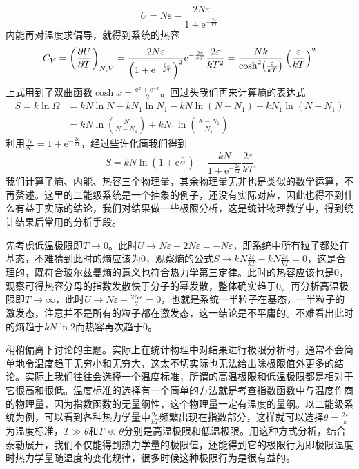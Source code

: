 \documentclass[../../main.tex]{subfiles}
\begin{document}
\begin{equation}
    U=N\varepsilon-\frac{2N\varepsilon}{1+\mathrm{e}^{-\frac{2\varepsilon}{kT}}}
\end{equation}
内能再对温度求偏导，就得到系统的热容
\begin{equation}
    C_V=\left(\pdv{U}{T}\right)_{N,V}=\frac{2N\varepsilon}{\left(1+\mathrm{e}^{-\frac{2\varepsilon}{kT}}\right)^2}\mathrm{e}^{-\frac{2\varepsilon}{kT}}\frac{2\varepsilon}{kT^2}=\frac{Nk}{\cosh[2](\frac{\varepsilon}{kT})}\left(\frac{\varepsilon}{kT}\right)^2
\end{equation}
上式用到了双曲函数\(\cosh x =\frac{\mathrm{e}^x+\mathrm{e}^{-x}}{2}\)。回过头我们再来计算熵的表达式
\begin{equation*}
    \begin{split}
        S=k\ln \Omega &=kN\ln N-kN_1\ln N_1-kN\ln(N-N_1) +kN_1\ln(N-N_1)\\
        &= kN\ln(\frac{N}{N-N_1})+kN_1\ln(\frac{N-N_1}{N_1})
    \end{split}
\end{equation*}
利用\(\frac{N}{N_1}=1+\mathrm{e}^{-\frac{2\varepsilon}{kT}}\)，经过些许化简我们得到
\begin{equation}
    S=kN\ln(1+\mathrm{e}^{\frac{2\varepsilon}{kT}})-\frac{kN}{1+\mathrm{e}^{-\frac{2\varepsilon}{kT}}}\frac{2\varepsilon}{kT}
\end{equation}
我们计算了熵、内能、热容三个物理量，其余物理量无非也是类似的数学运算，不再赘述。这里的二能级系统是一个抽象的例子，还没有实际对应，因此也得不到什么有益于实际的结论，我们对结果做一些极限分析，这是统计物理教学中，得到统计结果后常用的分析手段。

先考虑低温极限即\(T\to0\)。此时\(U\to N\varepsilon-2N\varepsilon=-N\varepsilon\)，即系统中所有粒子都处在基态，不难猜到此时的熵应该为0，观察熵的公式\(S\to kN\frac{2\varepsilon}{kT}-kN\frac{2\varepsilon}{kT}=0\)，这是合理的，既符合玻尔兹曼熵的意义也符合热力学第三定律。此时的热容应该也是0，观察可得热容分母的指数发散快于分子的幂发散，整体确实趋于0。再分析高温极限即\(T\to \infty\)，此时\(U\to N\varepsilon-\frac{2N\varepsilon}{2}=0\)，也就是系统一半粒子在基态，一半粒子的激发态，注意并不是所有的粒子都在激发态，这一结论是不平庸的。不难看出此时的熵趋于\(kN\ln2\)而热容再次趋于0。

稍稍偏离下讨论的主题。实际上在统计物理中对结果进行极限分析时，通常不会简单地令温度趋于无穷小和无穷大，这太不切实际也无法给出除极限值外更多的结论。实际上我们往往会选择一个温度标准，所谓的高温极限和低温极限都是相对于它很高和很低。温度标准的选择有一个简单的方法就是考查指数函数中与温度作商的物理量，因为指数函数的无量纲性，这个物理量一定有温度的量纲。以二能级系统为例，可以看到各种热力学量中\(\frac{2\varepsilon}{kT}\)频繁出现在指数部分，这样就可以选择\(\theta=\frac{2\varepsilon}{k}\)为温度标准，\(T\gg\theta\)和\(T\ll\theta\)分别是高温极限和低温极限。用这种方式分析，结合泰勒展开，我们不仅能得到热力学量的极限值，还能得到它的极限行为即极限温度时热力学量随温度的变化规律，很多时候这种极限行为是很有益的。
\end{document}
